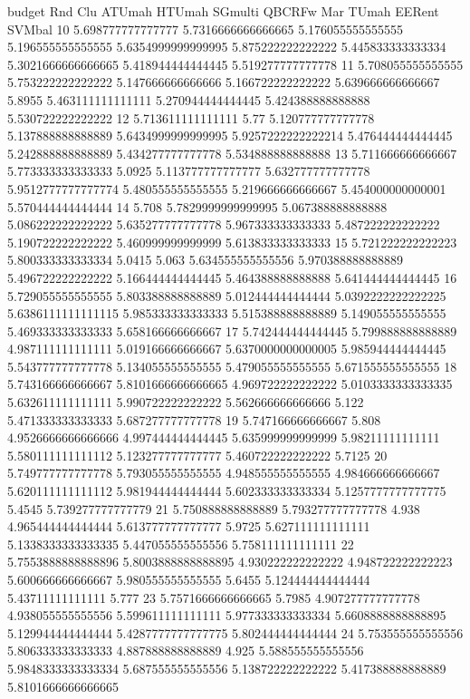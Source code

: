 budget Rnd Clu ATUmah HTUmah SGmulti QBCRFw Mar TUmah EERent SVMbal
10 5.698777777777777 5.7316666666666665 5.176055555555555 5.196555555555555 5.6354999999999995 5.875222222222222 5.445833333333334 5.3021666666666665 5.418944444444445 5.519277777777778
11 5.708055555555555 5.753222222222222 5.147666666666666 5.166722222222222 5.639666666666667 5.8955 5.463111111111111 5.270944444444445 5.424388888888888 5.530722222222222
12 5.713611111111111 5.77 5.120777777777778 5.137888888888889 5.6434999999999995 5.9257222222222214 5.476444444444445 5.242888888888889 5.434277777777778 5.534888888888888
13 5.711666666666667 5.773333333333333 5.0925 5.113777777777777 5.632777777777778 5.9512777777777774 5.480555555555555 5.219666666666667 5.454000000000001 5.570444444444444
14 5.708 5.7829999999999995 5.067388888888888 5.086222222222222 5.635277777777778 5.967333333333333 5.487222222222222 5.190722222222222 5.460999999999999 5.613833333333333
15 5.721222222222223 5.800333333333334 5.0415 5.063 5.634555555555556 5.970388888888889 5.496722222222222 5.166444444444445 5.464388888888888 5.641444444444445
16 5.729055555555555 5.803388888888889 5.012444444444444 5.0392222222222225 5.6386111111111115 5.985333333333333 5.515388888888889 5.149055555555555 5.469333333333333 5.658166666666667
17 5.742444444444445 5.799888888888889 4.987111111111111 5.019166666666667 5.6370000000000005 5.985944444444445 5.543777777777778 5.134055555555555 5.479055555555555 5.671555555555555
18 5.743166666666667 5.8101666666666665 4.969722222222222 5.0103333333333335 5.632611111111111 5.990722222222222 5.562666666666666 5.122 5.471333333333333 5.687277777777778
19 5.747166666666667 5.808 4.9526666666666666 4.997444444444445 5.635999999999999 5.98211111111111 5.580111111111112 5.123277777777777 5.460722222222222 5.7125
20 5.749777777777778 5.793055555555555 4.948555555555555 4.984666666666667 5.620111111111112 5.981944444444444 5.602333333333334 5.1257777777777775 5.4545 5.739277777777779
21 5.750888888888889 5.793277777777778 4.938 4.965444444444444 5.613777777777777 5.9725 5.627111111111111 5.1338333333333335 5.447055555555556 5.758111111111111
22 5.7553888888888896 5.8003888888888895 4.930222222222222 4.948722222222223 5.600666666666667 5.980555555555555 5.6455 5.124444444444444 5.43711111111111 5.777
23 5.7571666666666665 5.7985 4.907277777777778 4.938055555555556 5.599611111111111 5.977333333333334 5.6608888888888895 5.129944444444444 5.4287777777777775 5.802444444444444
24 5.753555555555556 5.806333333333333 4.887888888888889 4.925 5.588555555555556 5.9848333333333334 5.687555555555556 5.138722222222222 5.417388888888889 5.8101666666666665
